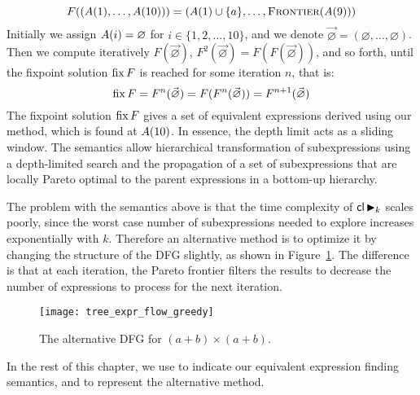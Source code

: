\begin{equation}
      F((A({1}), \ldots, A({10})))
    = (A({1}) \cup \{a\}, \ldots, \operatorname{\textsc{Frontier}}(A({9})))
    \label{so:eq:transfer_function}
\end{equation}
Initially we assign $A({i}) = \varnothing$ for $i\in\{1,2,\ldots,10\}$,
and we denote $\vec\varnothing = (\varnothing, \ldots, \varnothing)$.
Then we compute iteratively $F(\vec\varnothing)$, $F^2(\vec\varnothing) =
F(F(\vec\varnothing))$, and so forth, until the fixpoint solution $\operatorname{\mathrm{fix}} F$ is
reached for some iteration $n$, that is:
\begin{equation}
    \operatorname{\mathrm{fix}} F = F^n(\vec\varnothing) =
    F(F^n(\vec\varnothing)) = F^{n + 1}(\vec\varnothing)
\end{equation}
The fixpoint solution $\operatorname{\mathrm{fix}} F$ gives a set of equivalent expressions derived
using our method, which is found at $A({10})$. In essence, the depth limit
acts as a sliding window.  The semantics allow hierarchical transformation of
subexpressions using a depth-limited search and the propagation of a set of
subexpressions that are locally Pareto optimal to the parent expressions in a
bottom-up hierarchy.

The problem with the semantics above is that the time complexity of $\mathsf{cl}
\operatorname{\blacktriangleright}_k$ scales poorly, since the worst case number of subexpressions needed
to explore increases exponentially with $k$. Therefore an alternative method
is to optimize it by changing the structure of the DFG slightly, as shown in
Figure~\ref{so:fig:tree_expr_flow_greedy}. The difference is that at each
iteration, the Pareto frontier filters the results to decrease the number of
expressions to process for the next iteration.
\begin{figure}[ht]
    \centering
    \texttt{[image: tree\_expr\_flow\_greedy]}
    \caption{The alternative DFG for $(a + b) \times (a + b)$.
    }\label{so:fig:tree_expr_flow_greedy}
\end{figure}

In the rest of this chapter, we use \frontiertrace{} to indicate our equivalent
expression finding semantics, and \greedytrace{} to represent the alternative
method.
